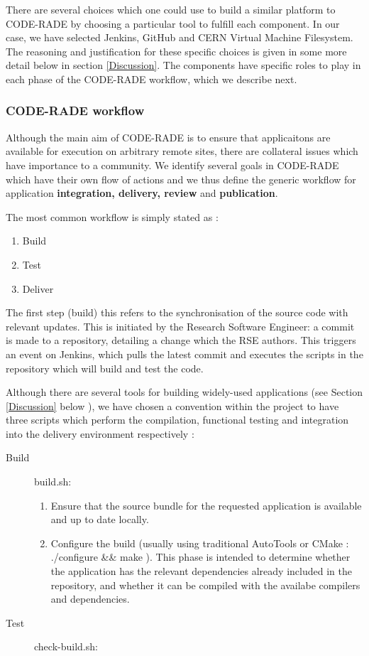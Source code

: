 \documentclass[a4paper]{jpconf}
\begin{document}
	There are several choices  which one could use to build a similar platform to CODE-RADE by choosing a particular tool to fulfill each component. In our case, we have selected Jenkins\cite{Jenkins}, GitHub\cite{Github} and CERN Virtual Machine Filesystem\cite{CVMFS}. The reasoning and justification for these specific choices is given in some more detail below in section \ref{Discussion}. The components have specific roles to play in each phase of the CODE-RADE workflow, which we describe next.

	\subsubsection{CODE-RADE workflow}

	Although the main aim of CODE-RADE is to ensure that applicaitons are available for execution on arbitrary remote sites, there are collateral issues which have importance to a community. We identify several goals in CODE-RADE which have their own flow of actions and we thus define the generic workflow for application {\bf integration, delivery, review} and {\bf publication}.

	The most common workflow is simply stated as :

	\begin{enumerate}
		\item Build
		\item Test
		\item Deliver
	\end{enumerate}

	The first step (build) this refers to the synchronisation of the source code with relevant updates. This is initiated by the Research Software Engineer: a commit is made to a repository, detailing a change which the RSE authors. This triggers an event on Jenkins, which pulls the latest commit and executes the scripts in the repository which will build and test the code.

	Although there are several tools for building widely-used applications (see Section \ref{Discussion} below ), we have chosen a convention within the project to have three scripts which perform the compilation, functional testing and integration into the delivery environment respectively :

  \begin{description}
    \item[Build] {\ttfamily build.sh}:
    \begin{enumerate}
      \item Ensure that the source bundle for the requested application is available and up to date locally.
      \item Configure the build (usually using traditional AutoTools \cite{autotools} or CMake \cite{CMake} : {\ttfamily ./configure \&\& make} ). This phase is intended to determine whether the application has the relevant dependencies already included in the repository, and whether it can be compiled with the availabe compilers and dependencies.
    \end{enumerate}
    \item[Test] {\ttfamily check-build.sh}:
  \end{description}
\end{document}
